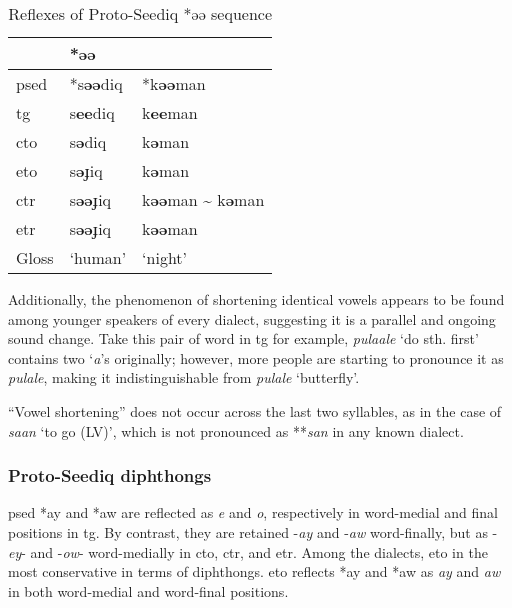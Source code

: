 \begin{table}[!htbp]
\centering
\caption{Reflexes of Proto-Seediq *əə sequence}
\label{tab:psed_VxVx}
\begin{tabular}{lll}
\hline
           & \multicolumn{2}{l}{*əə} \\ \hline
\acs{psed} & *s\textbf{əə}diq       & *k\textbf{əə}man            \\ \hdashline
\acs{tg}   & s\textbf{ee}diq        & k\textbf{ee}man             \\
\acs{cto}  & s\textbf{ə}diq         & k\textbf{ə}man              \\
\acs{eto}  & s\textbf{ə}ɟiq         & k\textbf{ə}man                    \\
\acs{ctr}  & s\textbf{əə}ɟiq        & k\textbf{əə}man \~{} k\textbf{ə}man              \\
\acs{etr}  & s\textbf{əə}ɟiq        & k\textbf{əə}man         \\ \hline
Gloss      & `human'       & `night'      \\ \hline
\end{tabular}
\end{table}

Additionally, the phenomenon of shortening identical vowels appears to be found among younger speakers of every dialect, suggesting it is a parallel and ongoing sound change. Take this pair of word in \acl{tg} for example, \textit{pulaale} `do sth. first' contains two `\textit{a}'s originally; however, more people are starting to pronounce it as \textit{pulale}, making it indistinguishable from \textit{pulale} `butterfly'.

``Vowel shortening'' does not occur across the last two syllables, as in the case of \textit{saan} `to go (LV)', which is not pronounced as **\textit{san} in any known dialect.

\subsubsection{Proto-Seediq diphthongs}

\acl{psed} *ay and *aw are reflected as \textit{e} and \textit{o}, respectively in word-medial and final positions in \acl{tg}. By contrast, they are retained -\textit{ay} and -\textit{aw} word-finally, but as -\textit{ey}- and -\textit{ow}- word-medially in \acl{cto}, \acl{ctr}, and \acl{etr}. Among the dialects, \acl{eto} in the most conservative in terms of diphthongs. \acl{eto} reflects *ay and *aw as \textit{ay} and \textit{aw} in both word-medial and word-final positions. 

